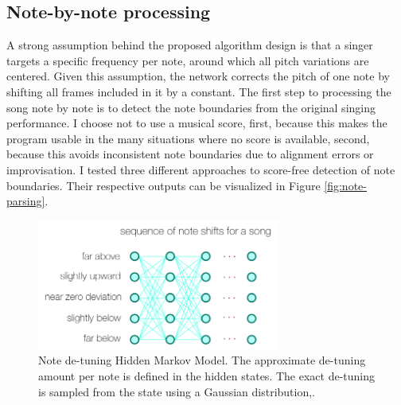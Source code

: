 \subsection{Note-by-note processing}
\label{sec:notes}
A strong assumption behind the proposed algorithm design is that a singer targets a specific frequency per note, around which all pitch variations are centered. Given this assumption, the network corrects the pitch of one note by shifting all frames included in it by a constant. The first step to processing the song note by note is to detect the note boundaries from the original singing performance. I choose not to use a musical score, first, because this makes the program usable in the many situations where no score is available, second, because this avoids inconsistent note boundaries due to alignment errors or improvisation. I tested three different approaches to score-free detection of note boundaries. Their respective outputs can be visualized in Figure \ref{fig:note-parsing}.
\begin{figure}[t!]
    \centering
    \includegraphics[width=8cm]{images/note_detuning_hmm.png}
    \caption{Note de-tuning Hidden Markov Model. The approximate de-tuning amount per note is defined in the hidden states. The exact de-tuning is sampled from the state using a Gaussian distribution,.}
    \label{fig:detuning_hmm}
\end{figure}

